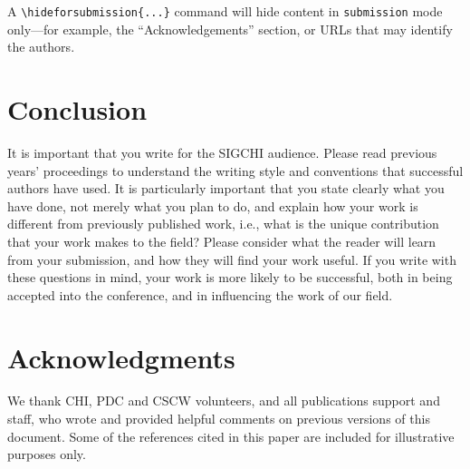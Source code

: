 \documentclass[preprint]{../latex/sigchi-modern}
\begin{document}
A \texttt{\textbackslash hideforsubmission\{...\}} command will hide content
in \texttt{submission} mode only---for example, the ``Acknowledgements''
section, or URLs that may identify the authors.

\section{Conclusion}
It is important that you write for the SIGCHI audience. Please read previous
years' proceedings to understand the writing style and conventions that
successful authors have used.  It is particularly important that you state
clearly what you have done, not merely what you plan to do, and explain how your
work is different from previously published work, i.e., what is the unique
contribution that your work makes to the field?  Please consider what the reader
will learn from your submission, and how they will find your work useful. If you
write with these questions in mind, your work is more likely to be successful,
both in being accepted into the conference, and in influencing the work of our
field.

\section{Acknowledgments}
We thank CHI, PDC and CSCW volunteers, and all publications support and staff,
who wrote and provided helpful comments on previous versions of this document.
Some of the references cited in this paper are included for illustrative
purposes only.


\end{document}
